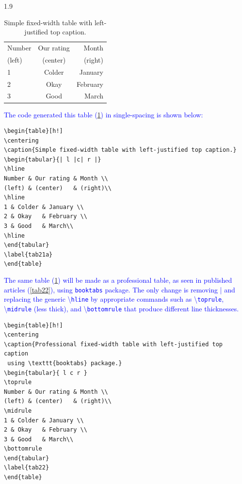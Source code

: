 \documentclass[phd]{ndsu-thesis-2022}
\newcommand\myspacing{1.9}      %
\newcommand\italk[1]{\textcolor{blue}{#1}}  %
\newcommand\cmd[1]{\textbackslash\texttt{#1}}  %
\begin{document}
\begin{spacing}{\myspacing}
\begin{table}[h!]
\centering
\caption{Simple fixed-width table with left-justified top caption.}
\begin{tabular}{| l |c| r |}
\hline
Number & Our rating & Month \\
(left) & (center)   & (right)\\
\hline
1 & Colder & January \\
2 & Okay   & February \\
3 & Good   & March\\
\hline
\end{tabular}
\label{tab21}
\end{table}

\italk{The code generated this table (\cref{tab21}) in single-spacing is shown below:}

{\singlespacing
\begin{verbatim}
\begin{table}[h!]
\centering
\caption{Simple fixed-width table with left-justified top caption.}
\begin{tabular}{| l |c| r |}
\hline
Number & Our rating & Month \\
(left) & (center)   & (right)\\
\hline
1 & Colder & January \\
2 & Okay   & February \\
3 & Good   & March\\
\hline
\end{tabular}
\label{tab21a}
\end{table}
\end{verbatim}
}

\italk{The same table (\cref{tab21}) will be made as a professional table, as seen in published articles (\cref{tab22}), using \texttt{booktabs} package. The only change is removing | and replacing the generic \cmd{hline} by appropriate commands such as \cmd{toprule}, \cmd{midrule} (less thick), and \cmd{bottomrule} that produce different line thicknesses.
}

{\singlespacing
\begin{verbatim}
\begin{table}[h!]
\centering
\caption{Professional fixed-width table with left-justified top caption
 using \texttt{booktabs} package.}
\begin{tabular}{ l c r }
\toprule
Number & Our rating & Month \\
(left) & (center)   & (right)\\
\midrule
1 & Colder & January \\
2 & Okay   & February \\
3 & Good   & March\\
\bottomrule
\end{tabular}
\label{tab22}
\end{table}
\end{verbatim}
}\label{tabcode22}


\end{spacing}
\end{document}
